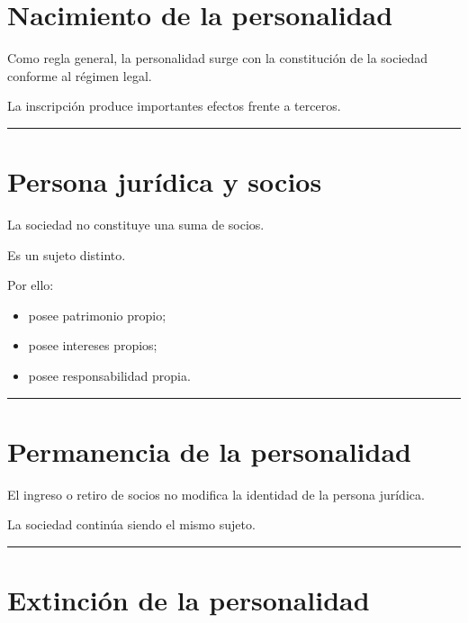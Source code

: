 \documentclass[
  spanish,
  letterpaper,
  DIV=11,
  numbers=noendperiod]{scrartcl}
\providecommand{\tightlist}{%
  \setlength{\itemsep}{0pt}\setlength{\parskip}{0pt}}
\begin{document}
\section{Nacimiento de la
personalidad}\label{nacimiento-de-la-personalidad}

Como regla general, la personalidad surge con la constitución de la
sociedad conforme al régimen legal.

La inscripción produce importantes efectos frente a terceros.

\begin{center}\rule{0.5\linewidth}{0.5pt}\end{center}

\section{Persona jurídica y socios}\label{persona-juruxeddica-y-socios}

La sociedad no constituye una suma de socios.

Es un sujeto distinto.

Por ello:

\begin{itemize}
\tightlist
\item
  posee patrimonio propio;
\item
  posee intereses propios;
\item
  posee responsabilidad propia.
\end{itemize}

\begin{center}\rule{0.5\linewidth}{0.5pt}\end{center}

\section{Permanencia de la
personalidad}\label{permanencia-de-la-personalidad}

El ingreso o retiro de socios no modifica la identidad de la persona
jurídica.

La sociedad continúa siendo el mismo sujeto.

\begin{center}\rule{0.5\linewidth}{0.5pt}\end{center}

\section{Extinción de la
personalidad}\label{extinciuxf3n-de-la-personalidad}
\end{document}
